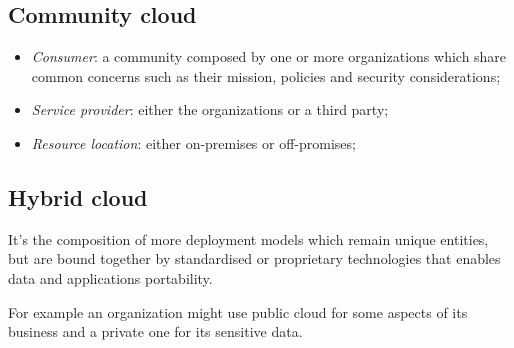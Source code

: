 \subsection{Community cloud}
\begin{itemize}
    \item \emph{Consumer}: a community composed by one or more organizations
    which share common concerns such as their mission, policies and security
    considerations;
    \item \emph{Service provider}: either the organizations or a third party;
    \item \emph{Resource location}: either on-premises or off-promises;
\end{itemize}

\subsection{Hybrid cloud}
It's the composition of more deployment models which remain unique
entities, but are bound together by standardised or proprietary technologies
that enables data and applications portability.

For example an organization might use public cloud for some aspects of its
business and a private one for its sensitive data.